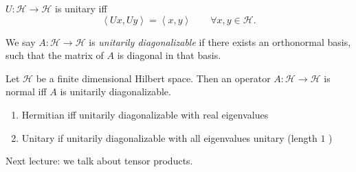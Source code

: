 
\begin{lemma}
	\label{lem:UnitaryCondition}
	$U: \mathscr{H} \to  \mathscr{H}$ is unitary iff
	\[
		\left\langle Ux, Uy \right\rangle  = \left\langle x, y \right\rangle  
		\qquad \forall x, y \in \mathscr{H}
	.\] 
\end{lemma}

\begin{definition}
	\label{defn:UnitarilyDiagonalizable}
	We say $A: \mathscr{H} \to  \mathscr{H}$ is \textit{unitarily diagonalizable} if there exists an orthonormal basis, such that the matrix of $A$ is diagonal in that basis.
\end{definition}

\begin{theorem}
	\label{thm:SpectralThmFiniteDim}
	Let $\mathscr{H}$ be a finite dimensional Hilbert space. Then an operator $A: \mathscr{H} \to  \mathscr{H}$ is normal iff $A$ is unitarily diagonalizable.
\end{theorem}

\begin{corollary}
	\begin{enumerate}
		\item Hermitian iff unitarily diagonalizable with real eigenvalues
		\item Unitary if unitarily diagonalizable with all eigenvalues unitary (length $1$ )
	\end{enumerate}
\end{corollary}

Next lecture: we talk about tensor products.

